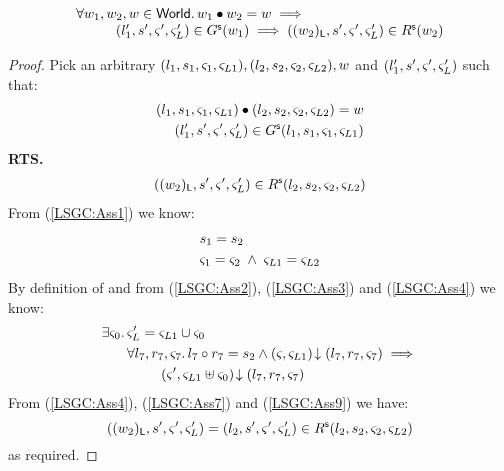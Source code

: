\begin{lemma}[]\label{lem:shiftGContainment}
%
\[
\begin{array}{l}
	\forall w_1, w_2, w \in \textsf{World}.\, w_1 \bullet w_2 = w \implies\\
	\hspace*{1cm}(l'_1, s', \varsigma_{}', \varsigma_{L}') \in G^{\textsf{s}}(w_1) \implies ((w_2)_{\textsf{L}}, s', \varsigma_{}', \varsigma_{L}') \in R^{\textsf{s}}(w_2)
\end{array}
\]
%
\begin{proof} Pick an arbitrary $(l_1, s_1, \varsigma_{1}, \varsigma_{L1}), (l_2, s_2, \varsigma_{2}, \varsigma_{L2}), w$ and $(l'_1, s', \varsigma_{}', \varsigma_{L}')$ such that:
%
\begin{align}
	(l_1, s_1, \varsigma_{1}, \varsigma_{L1}) \bullet (l_2, s_2, \varsigma_{2}, \varsigma_{L2}) = w \label{LSGC:Ass1}\\
	(l'_1, s', \varsigma_{}', \varsigma_{L}') \in G^{\textsf{s}}(l_1, s_1, \varsigma_{1}, \varsigma_{L1}) \label{LSGC:Ass2}
\end{align}
%
\textbf{RTS.}
%
\begin{align}
	((w_2)_{\textsf{L}}, s', \varsigma_{}', \varsigma_{L}') \in R^{\textsf{s}}(l_2, s_2, \varsigma_{2}, \varsigma_{L2}) \label{LSGC:Goal}
\end{align}
From (\ref{LSGC:Ass1}) we know:
%
\begin{align}
	& s_1 = s_2 \label{LSGC:Ass3}\\
	& \varsigma_{1} = \varsigma_{2} \;\land\; \varsigma_{L1} = \varsigma_{L2} \label{LSGC:Ass4}
\end{align}
%
By definition of \shiftG and from (\ref{LSGC:Ass2}), (\ref{LSGC:Ass3}) and (\ref{LSGC:Ass4}) we know:
%
\begin{align}
%
	\exsts{\amod{0}} & \amod{L}' = \amod{L1} \cup \amod{0} \label{LSGC:Ass7}\\
%	
	&\for{l_7, r_7, \amod{7}} l_7 \composeL r_7 = s_2 \land \extendsAM{\amod{}, \amod{L1}}{l_7}{r_7}{\amod{7}} \implies \nonumber\\ 
	&\hspace*{0.8cm}\extendsAM{\amod{}', \amod{L1} \uplus \amod{0}}{l_7}{r_7}{\amod{7}}  \label{LSGC:Ass9}
%
\end{align}
%
From (\ref{LSGC:Ass4}), (\ref{LSGC:Ass7}) and (\ref{LSGC:Ass9}) we have:
%
\begin{equation}
	((w_2)_{\textsf{L}}, s', \varsigma_{}', \varsigma_{L}') = (l_2, s', \varsigma_{}', \varsigma_{L}') \in R^{\textsf{s}}(l_2, s_2, \varsigma_{2}, \varsigma_{L2}) \nonumber
\end{equation}
% 
as required.
\end{proof}
%
%
\end{lemma}
%
